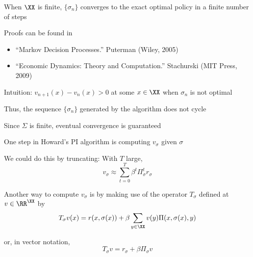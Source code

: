 \begin{frame}
    
    \Fact When $\XX$ is finite, $\{\sigma_n\}$ converges to the exact optimal policy in a
    finite number of steps

        \vspace{0.5em}
    Proofs can be found in 
    \begin{itemize}
        \item ``Markov Decision Processes.'' Puterman (Wiley, 2005)
        \vspace{0.5em}
        \item ``Economic Dynamics: Theory and Computation.'' Stachurski (MIT
            Press, 2009)
    \end{itemize}

        \vspace{0.5em}
        \vspace{0.5em}
    Intuition: $v_{n+1}(x) - v_n(x) > 0$ at some $x \in \XX$ when $\sigma_n$ is not optimal
    
    Thus, the sequence $\{\sigma_n\}$ generated by the algorithm does not cycle
      
    Since $\Sigma$ is finite, eventual convergence is guaranteed

\end{frame}


\begin{frame}
    
    One step in Howard's PI algorithm is computing $v_\sigma$ given $\sigma$
    
    We could do this by truncating: With $T$ large,  
    \begin{equation*}
        \label{eq:vsigdct}
        v_\sigma \approx \sum_{t = 0}^T \beta^t \Pi_\sigma^t r_\sigma
    \end{equation*}

    Another way to compute $v_\sigma$ is by making use of the operator $T_\sigma$ defined
    at $v \in \RR^\XX$ by
    \begin{equation*}
        T_\sigma v (x)
        =
            r(x, \sigma(x))
            + \beta
            \sum_{y \in \XX} v(y) \Pi(x, \sigma(x), y)
        \end{equation*}

    or, in vector notation,
    \begin{equation*}
        T_\sigma v 
        = r_\sigma + \beta \Pi_\sigma v
    \end{equation*}

\end{frame}


